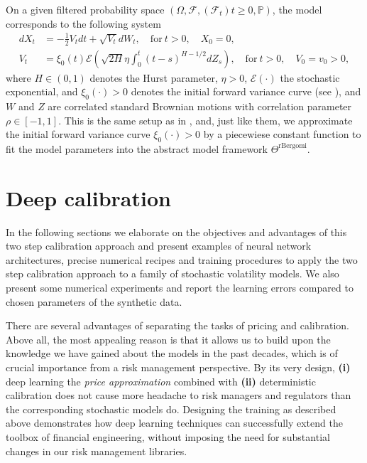 \documentclass{article}
\theoremstyle{remark}
\begin{document}
On a given filtered probability space $(\Omega, \mathcal{F}, (\mathcal{F}_t){t \ge 0}, \mathbb{P})$, the model
corresponds to the following system
\begin{subequations}
  \label{eq:rbergomi}
  \begin{align}
    dX_t & =-\frac{1}{2} V_t dt +\sqrt{V_t} dW_t,\quad \textrm{for} \ t>0, \quad X_0=0, \\
    V_t  & =\xi_0(t)\mathcal{E}\left(\sqrt{2H}\eta \int_0^t
          (t-s)^{H-1/2}dZ_s\right),\quad \textrm{for} \ t>0, \quad V_0=v_0>0, 
  \end{align}
\end{subequations}
where $H \in (0,1)$ denotes the Hurst parameter, $\eta>0$,
$\mathcal{E}(\cdot)$ the stochastic exponential,
and $\xi_0(\cdot) >0$ denotes the initial forward variance curve (see \cite[Section 6]{BergomiBook}),
and $W$ and $Z$ are correlated standard Brownian motions with correlation parameter $\rho\in [-1,1]$.
This is the same setup as in \cite{HMM19}, and, just like them, we approximate the initial forward variance curve $\xi_0 (\cdot) > 0$
by a piecewiese constant function to fit the model parameters into the abstract model framework $\Theta^{\mathrm{rBergomi}}$.

\section{Deep calibration}
\label{sec:pricing}
In the following sections we
elaborate on the objectives and advantages of this two step calibration
approach and present examples of neural network architectures, precise
numerical recipes and training procedures to apply the two step calibration
approach to a family of stochastic volatility models. We also present some
numerical experiments and report the learning errors compared to chosen parameters of the synthetic data.

There are several advantages of separating the tasks of pricing and
calibration. Above
all, the most appealing reason is that it allows us to build upon the
knowledge we have gained about the models in the past decades, which is of
crucial importance from a risk management perspective. By its very design,
\textbf{(i)} deep learning the \emph{price approximation} combined with
\textbf{(ii)} deterministic calibration does not cause more headache to risk
managers and regulators than the corresponding stochastic models do.
Designing the training as described above demonstrates how deep learning
techniques can successfully extend the toolbox of financial engineering,
without imposing the need for substantial changes in our risk management libraries.
\end{document}
